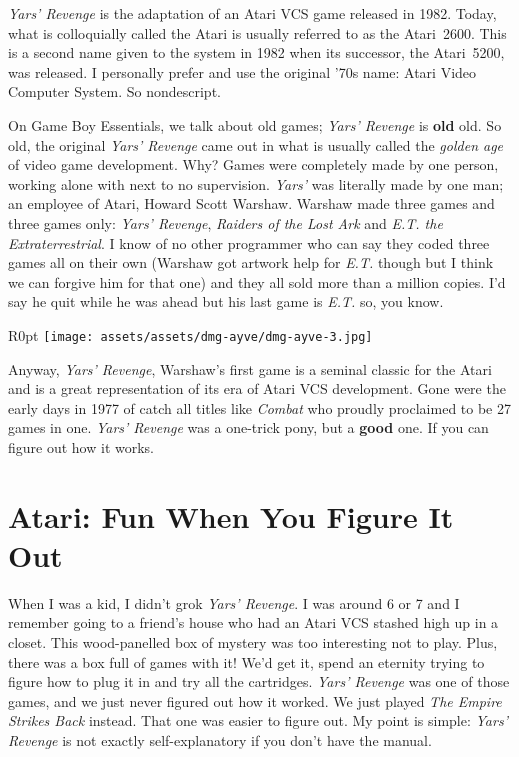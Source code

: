 \documentclass{book}
\begin{document}
\emph{Yars’ Revenge} is the adaptation of an Atari VCS game released in 1982. Today, what is colloquially called the Atari is usually referred to as the Atari~2600. This is a second name given to the system in 1982 when its successor, the Atari~5200, was released. I personally prefer and use the original ’70s name: Atari Video Computer System. So nondescript.

On Game Boy Essentials, we talk about old games; \emph{Yars’ Revenge} is \textbf{old} old. So old, the original \emph{Yars’ Revenge} came out in what is usually called the \emph{golden age} of video game development. Why? Games were completely made by one person, working alone with next to no supervision. \emph{Yars’} was literally made by one man; an employee of Atari, Howard Scott Warshaw. Warshaw made three games and three games only: \emph{Yars’ Revenge}, \emph{Raiders of the Lost Ark} and \emph{E.T. the Extraterrestrial}. I know of no other programmer who can say they coded three games all on their own (Warshaw got artwork help for \emph{E.T.} though but I think we can forgive him for that one) and they all sold more than a million copies. I’d say he quit while he was ahead but his last game is \emph{E.T.} so, you know.

\begin{wrapfigure}{R}{0pt} \texttt{[image: assets/assets/dmg-ayve/dmg-ayve-3.jpg]}\end{wrapfigure}
Anyway, \emph{Yars’ Revenge}, Warshaw’s first game is a seminal classic for the Atari and is a great representation of its era of Atari VCS development. Gone were the early days in 1977 of catch all titles like \emph{Combat} who proudly proclaimed to be 27 games in one. \emph{Yars’ Revenge} was a one-trick pony, but a \textbf{good} one. If you can figure out how it works.

\FloatBarrier\needspace{10mm}\section*{Atari: Fun When You Figure It Out}\nopagebreak[4]

When I was a kid, I didn’t grok \emph{Yars’ Revenge}. I was around 6 or 7 and I remember going to a friend’s house who had an Atari VCS stashed high up in a closet. This wood-panelled box of mystery was too interesting not to play. Plus, there was a box full of games with it! We’d get it, spend an eternity trying to figure how to plug it in and try all the cartridges. \emph{Yars’ Revenge} was one of those games, and we just never figured out how it worked. We just played \emph{The Empire Strikes Back} instead. That one was easier to figure out. My point is simple: \emph{Yars’ Revenge} is not exactly self-explanatory if you don’t have the manual.
\end{document}
